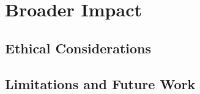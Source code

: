 \chapter{Broader Impact}
\label{chap:Broader}

\section{Ethical Considerations}
\label{sec:ethical}

\section{Limitations and Future Work}

